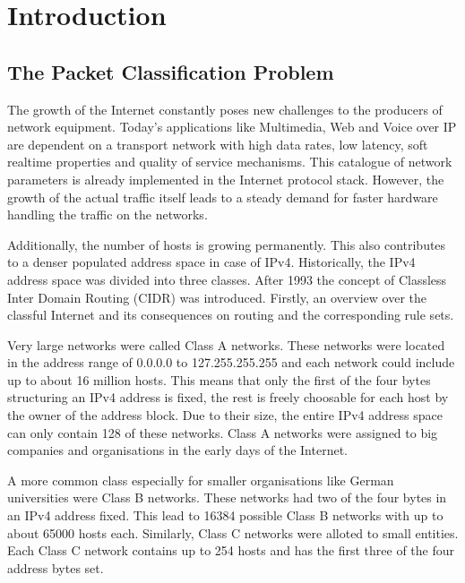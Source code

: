 \documentclass[a4paper,
		12pt,
		parskip=full,
		titlepage
		]{scrartcl}
\begin{document}


\setcounter{page}{1}
\tableofcontents{}

\pagebreak

\pagestyle{scrheadings}

\section{Introduction}
\subsection{The Packet Classification Problem}
The growth of the Internet constantly poses new challenges to the producers of network equipment.
Today's applications like Multimedia, Web and Voice over IP are dependent on a transport network with
high data rates, low latency, soft realtime properties and quality of service mechanisms.
This catalogue of network parameters is already implemented in the Internet protocol stack.
However, the growth of the actual traffic itself leads to a steady demand for faster hardware handling the traffic on the networks. 

Additionally, the number of hosts is growing permanently.
This also contributes to a denser populated address space in case of IPv4.
Historically, the IPv4 address space was divided into three classes\cite{rfc1466}.
After 1993 the concept of Classless Inter Domain Routing (CIDR) was introduced.
Firstly, an overview over the classful Internet and its consequences on routing and the corresponding rule sets.

Very large networks were called Class A networks.
These networks were located in the address range of 0.0.0.0 to 127.255.255.255 and each network could include up to about 16 million hosts.
This means that only the first of the four bytes structuring an IPv4 address is fixed, the rest is freely choosable for each host by the owner of the address block.
Due to their size, the entire IPv4 address space can only contain 128 of these networks.
Class A networks were assigned to big companies and organisations in the early days of the Internet.

A more common class especially for smaller organisations like German universities were Class B networks.
These networks had two of the four bytes in an IPv4 address fixed.
This lead to 16384 possible Class B networks with up to about 65000 hosts each.
Similarly, Class C networks were alloted to small entities.
Each Class C network contains up to 254 hosts and has the first three of the four address bytes set.
\end{document}
